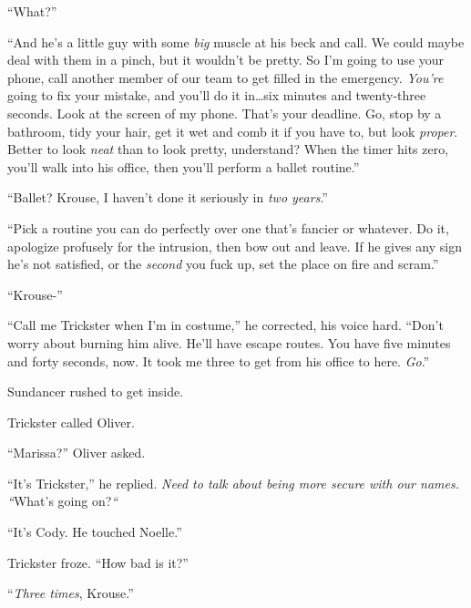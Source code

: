 ``What?''



``And he's a little guy with some \emph{big} muscle at his beck and call.  We could maybe deal with them in a pinch, but it wouldn't be pretty.  So I'm going to use your phone, call another member of our team to get filled in the emergency.  \emph{You're} going to fix your mistake, and you'll do it in\ldots six minutes and twenty-three seconds.  Look at the screen of my phone.  That's your deadline.  Go, stop by a bathroom, tidy your hair, get it wet and comb it if you have to, but look \emph{proper}.  Better to look \emph{neat} than to look pretty, understand?  When the timer hits zero, you'll walk into his office, then you'll perform a ballet routine.''



``Ballet?  Krouse, I haven't done it seriously in \emph{two years}.''



``Pick a routine you can do perfectly over one that's fancier or whatever.  Do it, apologize profusely for the intrusion, then bow out and leave.  If he gives any sign he's not satisfied, or the \emph{second} you fuck up, set the place on fire and scram.''



``Krouse-''



``Call me Trickster when I'm in costume,'' he corrected, his voice hard.  ``Don't worry about burning him alive.  He'll have escape routes.  You have five minutes and forty seconds, now.  It took me three to get from his office to here.  \emph{Go}.''



Sundancer rushed to get inside.



Trickster called Oliver.



``Marissa?'' Oliver asked.



``It's Trickster,'' he replied.  \emph{Need to talk about being more secure with our names.  ``}What's going on?\emph{``}



``It's Cody.  He touched Noelle.''



Trickster froze.  ``How bad is it?''



``\emph{Three times}, Krouse.''



